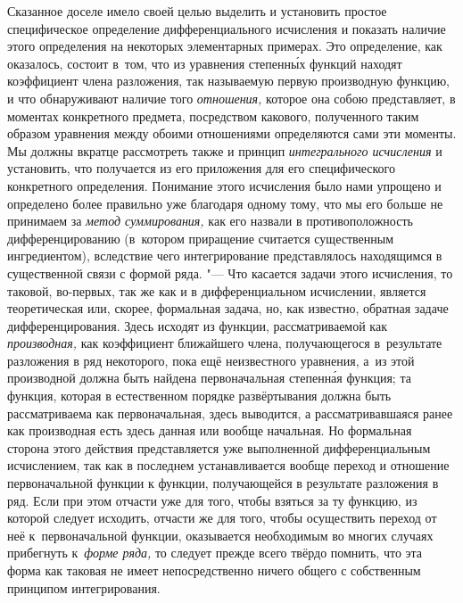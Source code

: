 Сказанное доселе имело своей целью выделить и установить простое специфическое
определение дифференциального исчисления и показать наличие этого определения
на некоторых элементарных примерах. Это определение, как оказалось, состоит
в~том, что из уравнения степенн\'{ы}х функций находят коэффициент члена разложения,
так называемую первую производную функцию, и что обнаруживают наличие того
{\em отношения,} которое она собою представляет, в моментах конкретного
предмета, посредством какового, полученного таким образом уравнения между
обоими отношениями определяются сами эти моменты. Мы должны вкратце рассмотреть
также и принцип {\em интегрального исчисления} и установить, что получается из
его приложения для его специфического конкретного определения. Понимание этого
исчисления было нами упрощено и определено более правильно уже благодаря одному
тому, что мы его больше не принимаем за {\em метод суммирования,} как его
назвали в противоположность дифференцированию (в~котором приращение считается
существенным ингредиентом), вследствие чего интегрирование представлялось
находящимся в существенной связи с формой ряда. "--- Что касается задачи этого
исчисления, то таковой, во-первых, так же как и в дифференциальном исчислении,
является теоретическая или, скорее, формальная задача, но, как известно,
обратная задаче дифференцирования. Здесь исходят из функции, рассматриваемой
как {\em производная,} как коэффициент ближайшего члена, получающегося
в~результате разложения в ряд некоторого, пока ещё неизвестного уравнения, а~из
этой производной должна быть найдена первоначальная степенн\'{а}я функция; та
функция, которая в естественном \label{bkm:bm53b}порядке развёртывания должна
быть рассматриваема как первоначальная, здесь выводится, а рассматривавшаяся
ранее как производная есть здесь данная или вообще начальная. Но формальная
сторона этого действия представляется уже выполненной дифференциальным
исчислением, так как в последнем устанавливается вообще переход и отношение
первоначальной функции к функции, получающейся в результате разложения в ряд.
Если при этом отчасти уже для того, чтобы взяться за ту функцию, из которой
следует исходить, отчасти же для того, чтобы осуществить переход от неё
к~первоначальной функции, оказывается необходимым во многих случаях прибегнуть
к~{\em форме ряда,} то следует прежде всего твёрдо помнить, что эта форма как
таковая не имеет непосредственно ничего общего с собственным принципом
интегрирования.


